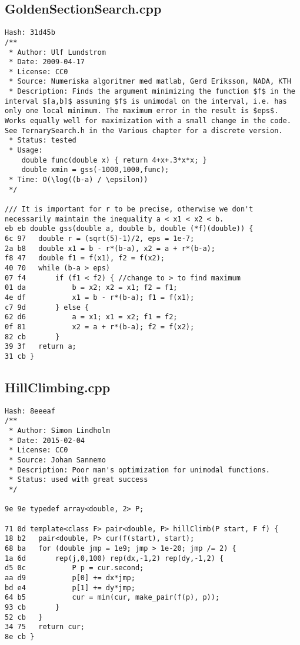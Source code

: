 \documentclass[11pt, a4paper, twoside]{article}
\begin{document}
\subsection{GoldenSectionSearch.cpp}
\begin{lstlisting}
Hash: 31d45b
/**
 * Author: Ulf Lundstrom
 * Date: 2009-04-17
 * License: CC0
 * Source: Numeriska algoritmer med matlab, Gerd Eriksson, NADA, KTH
 * Description: Finds the argument minimizing the function $f$ in the interval $[a,b]$ assuming $f$ is unimodal on the interval, i.e. has only one local minimum. The maximum error in the result is $eps$. Works equally well for maximization with a small change in the code. See TernarySearch.h in the Various chapter for a discrete version.
 * Status: tested
 * Usage:
	double func(double x) { return 4+x+.3*x*x; }
	double xmin = gss(-1000,1000,func);
 * Time: O(\log((b-a) / \epsilon))
 */

/// It is important for r to be precise, otherwise we don't necessarily maintain the inequality a < x1 < x2 < b.
eb eb double gss(double a, double b, double (*f)(double)) {
6c 97 	double r = (sqrt(5)-1)/2, eps = 1e-7;
2a b8 	double x1 = b - r*(b-a), x2 = a + r*(b-a);
f8 47 	double f1 = f(x1), f2 = f(x2);
40 70 	while (b-a > eps)
07 f4 		if (f1 < f2) { //change to > to find maximum
01 da 			b = x2; x2 = x1; f2 = f1;
4e df 			x1 = b - r*(b-a); f1 = f(x1);
c7 9d 		} else {
62 d6 			a = x1; x1 = x2; f1 = f2;
0f 81 			x2 = a + r*(b-a); f2 = f(x2);
82 cb 		}
39 3f 	return a;
31 cb }
\end{lstlisting}

\subsection{HillClimbing.cpp}
\begin{lstlisting}
Hash: 8eeeaf
/**
 * Author: Simon Lindholm
 * Date: 2015-02-04
 * License: CC0
 * Source: Johan Sannemo
 * Description: Poor man's optimization for unimodal functions.
 * Status: used with great success
 */

9e 9e typedef array<double, 2> P;

71 0d template<class F> pair<double, P> hillClimb(P start, F f) {
18 b2 	pair<double, P> cur(f(start), start);
68 ba 	for (double jmp = 1e9; jmp > 1e-20; jmp /= 2) {
1a 6d 		rep(j,0,100) rep(dx,-1,2) rep(dy,-1,2) {
d5 0c 			P p = cur.second;
aa d9 			p[0] += dx*jmp;
bd e4 			p[1] += dy*jmp;
64 b5 			cur = min(cur, make_pair(f(p), p));
93 cb 		}
52 cb 	}
34 75 	return cur;
8e cb }
\end{lstlisting}
\end{document}
